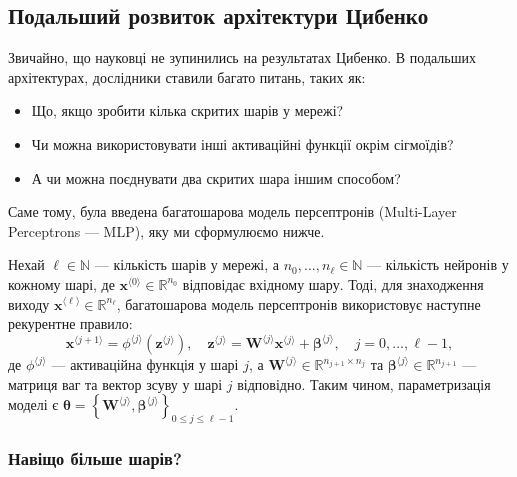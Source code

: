 \subsection{Подальший розвиток архітектури Цибенко}

Звичайно, що науковці не зупинились на результатах Цибенко. В подальших 
архітектурах, дослідники ставили багато питань, таких як:
\begin{itemize}
	\item Що, якщо зробити кілька скритих шарів у мережі?
	\item Чи можна використовувати інші активаційні функції окрім сігмоїдів?
	\item А чи можна поєднувати два скритих шара іншим способом?
\end{itemize}

Саме тому, була введена багатошарова модель персептронів (Multi-Layer
Perceptrons --- MLP), яку ми сформулюємо нижче.
\begin{definition}\label{def:mlp}
	Нехай $\ell \in \mathbb{N}$ --- кількість шарів у мережі, а
	$n_0,\dots,n_{\ell} \in \mathbb{N}$ --- кількість нейронів у кожному шарі,
	де $\mathbf{x}^{\langle 0 \rangle} \in \mathbb{R}^{n_0}$ відповідає вхідному
	шару. Тоді, для знаходження виходу $\mathbf{x}^{\langle \ell \rangle} \in
	\mathbb{R}^{n_{\ell}}$, багатошарова модель персептронів використовує
	наступне рекурентне правило:
	\begin{equation*}
		\mathbf{x}^{\langle j+1 \rangle} = \phi^{\langle j \rangle}(\mathbf{z}^{\langle j \rangle}), \quad \mathbf{z}^{\langle j \rangle} = \boldsymbol{W}^{\langle j \rangle}\mathbf{x}^{\langle j \rangle} + \boldsymbol{\beta}^{\langle j \rangle}, \quad j = 0,\dots,\ell-1,
	\end{equation*}
	де $\phi^{\langle j \rangle}$ --- активаційна функція у шарі $j$, а
	$\boldsymbol{W}^{\langle j \rangle} \in \mathbb{R}^{n_{j+1} \times n_j}$ та
	$\boldsymbol{\beta}^{\langle j \rangle} \in \mathbb{R}^{n_{j+1}}$ ---
	матриця ваг та вектор зсуву у шарі $j$ відповідно. Таким чином,
	параметризація моделі є $\boldsymbol{\theta} =
	\left\{\boldsymbol{W}^{\langle j \rangle},\boldsymbol{\beta}^{\langle j
	\rangle}\right\}_{0 \leq j \leq \ell-1}$.
\end{definition}

\subsubsection{Навіщо більше шарів?}

